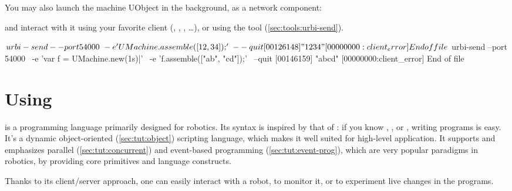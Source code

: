 You may also launch the machine UObject in the background, as a network
component:


\noindent
and interact with it using your favorite client (,
, , \ldots), or using the 
tool (\autoref{sec:tools:urbi-send}).

\begin{shell}[alsolanguage={[interactive]urbiscript}]
$ urbi-send --port 54000                       \
            -e 'UMachine.assemble([12, 34]);'  \
            --quit
[00126148] "1234"
[00000000:client_error] End of file
$ urbi-send --port 54000                     \
            -e 'var f = UMachine.new(1s)|'   \
            -e 'f.assemble(["ab", "cd"]);'   \
            --quit
[00146159] "abcd"
[00000000:client_error] End of file
\end{shell}




\section{Using \us}


\us is a programming language primarily designed for robotics.  Its syntax
is inspired by that of \Cxx: if you know \langC, \Cxx, \Java or \Cs, writing \us
programs is easy.  It's a dynamic object-oriented (\autoref{sec:tut:object})
scripting language, which makes it well suited for high-level application.
It supports and emphasizes parallel (\autoref{sec:tut:concurrent}) and
event-based programming (\autoref{sec:tut:event-prog}), which are very
popular paradigms in robotics, by providing core primitives and language
constructs.

Thanks to its client/server approach, one can easily interact with a robot,
to monitor it, or to experiment live changes in the \us programs.

